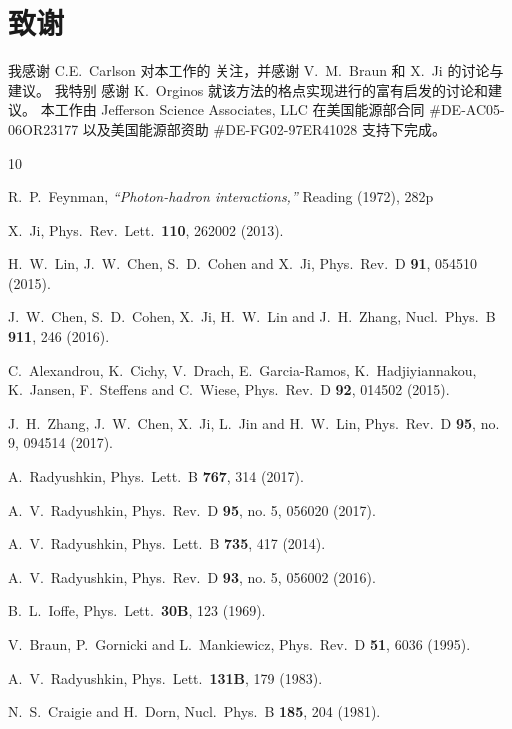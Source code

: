 \section*{致谢}

我感谢 C.E.~Carlson 对本工作的
关注，并感谢 V.~M.~Braun 和 X.~Ji 的讨论与建议。
我特别
感谢 K.~Orginos 就该方法的格点实现进行的富有启发的讨论和建议。
本工作由 Jefferson Science Associates, LLC 在美国能源部合同
\#DE-AC05-06OR23177 以及美国能源部资助 \mbox{\#DE-FG02-97ER41028}
支持下完成。

\begin{thebibliography}{10}

R.~P.~Feynman,
{\it ``Photon-hadron interactions,''}
Reading (1972), 282p

X.~Ji,
Phys.\ Rev.\ Lett.\ {\bf 110}, 262002 (2013).

H.~W.~Lin, J.~W.~Chen, S.~D.~Cohen and X.~Ji,
Phys.\ Rev.\ D {\bf 91}, 054510 (2015).

J.~W.~Chen, S.~D.~Cohen, X.~Ji, H.~W.~Lin and J.~H.~Zhang,
Nucl.\ Phys.\ B {\bf 911}, 246 (2016).

C.~Alexandrou, K.~Cichy, V.~Drach, E.~Garcia-Ramos, K.~Hadjiyiannakou, K.~Jansen, F.~Steffens and C.~Wiese,
Phys.\ Rev.\ D {\bf 92}, 014502 (2015).

J.~H.~Zhang, J.~W.~Chen, X.~Ji, L.~Jin and H.~W.~Lin,
Phys.\ Rev.\ D {\bf 95}, no. 9, 094514 (2017).

A.~Radyushkin,
Phys.\ Lett.\ B {\bf 767}, 314 (2017).

A.~V.~Radyushkin,
Phys.\ Rev.\ D {\bf 95}, no. 5, 056020 (2017).

A.~V.~Radyushkin,
Phys.\ Lett.\ B {\bf 735}, 417 (2014).

A.~V.~Radyushkin,
Phys.\ Rev.\ D {\bf 93}, no. 5, 056002 (2016).

B.~L.~Ioffe,
Phys.\ Lett.\ {\bf 30B}, 123 (1969).

V.~Braun, P.~Gornicki and L.~Mankiewicz,
Phys.\ Rev.\ D {\bf 51}, 6036 (1995).

A.~V.~Radyushkin,
Phys.\ Lett.\ {\bf 131B}, 179 (1983).

N.~S.~Craigie and H.~Dorn,
Nucl.\ Phys.\ B {\bf 185}, 204 (1981).


\end{thebibliography}
